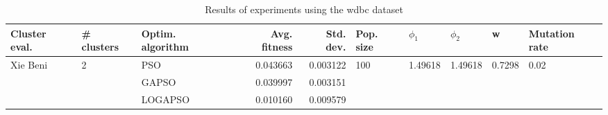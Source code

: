 \begin{table}
\centering
\caption{Results of experiments using the wdbc dataset}
\begin{tabular}{lllrrlllll}
\toprule
            Cluster eval. &        \# clusters & Optim. algorithm &  Avg. fitness &  Std. dev. &            Pop. size &               $\phi_{1}$ &               $\phi_{2}$ &                       w &         Mutation rate \\
\midrule
\multirow{3}{*}{Xie Beni} & \multirow{3}{*}{2} &              PSO &      0.043663 &   0.003122 & \multirow{3}{*}{100} & \multirow{3}{*}{1.49618} & \multirow{3}{*}{1.49618} & \multirow{3}{*}{0.7298} & \multirow{3}{*}{0.02} \\
                          &                    &            GAPSO &      0.039997 &   0.003151 &                      &                          &                          &                         &                       \\
                          &                    &          LOGAPSO &      0.010160 &   0.009579 &                      &                          &                          &                         &                       \\
\bottomrule
\end{tabular}
\end{table}
